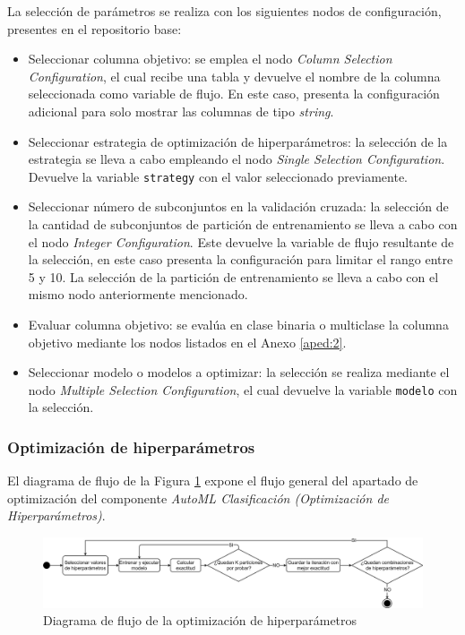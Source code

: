 La selección de parámetros se realiza con los siguientes nodos de configuración, presentes en el repositorio base:

\begin{itemize}
	\item Seleccionar columna objetivo: se emplea el nodo \textit{Column Selection Configuration}, el cual recibe una tabla y devuelve el nombre de la columna seleccionada como variable de flujo. En este caso, presenta la configuración adicional para solo mostrar las columnas de tipo \textit{string}.
	\item Seleccionar estrategia de optimización de hiperparámetros: la selección de la estrategia se lleva a cabo empleando el nodo \textit{Single Selection Configuration}. Devuelve la variable \texttt{strategy} con el valor seleccionado previamente.
	\item Seleccionar número de subconjuntos en la validación cruzada: la selección de la cantidad de subconjuntos de partición de entrenamiento se lleva a cabo con el nodo \textit{Integer Configuration}. Este devuelve la variable de flujo resultante de la selección, en este caso presenta la configuración para limitar el rango entre 5 y 10.  La selección de la partición de entrenamiento se lleva a cabo con el mismo nodo anteriormente mencionado.
	\item Evaluar columna objetivo: se evalúa en clase binaria o multiclase la columna objetivo mediante los nodos listados en el Anexo \ref{aped:2}.
	\item Seleccionar modelo o modelos a optimizar: la selección se realiza mediante el nodo \textit{Multiple Selection Configuration}, el cual devuelve la variable \texttt{modelo} con la selección.
\end{itemize}

\subsubsection*{Optimización de hiperparámetros}
El diagrama de flujo de la Figura \ref{fig:optimizacion-a-resumen-2} expone el flujo general del apartado de optimización del componente \textit{AutoML Clasificación (Optimización de Hiperparámetros)}.

\begin{figure}[H]
	\centering
	\includegraphics[width=1\linewidth]{"figuras/capi 2/hpo/Optimizacion a resumen 2.14"}
	\caption{Diagrama de flujo de la optimización de hiperparámetros}
	\label{fig:optimizacion-a-resumen-2}
\end{figure}


